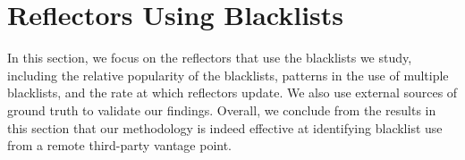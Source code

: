 \section{Reflectors Using Blacklists}
\label{sec:blacklist-use}






In this section, we focus on the reflectors that use the blacklists we
study, including the relative popularity of the blacklists, patterns
in the use of multiple blacklists, and the rate at which reflectors
update.  We also use external sources of ground truth to validate our
findings.  Overall, we conclude from the results in this section that
our methodology is indeed effective at identifying blacklist use from
a remote third-party vantage point.

